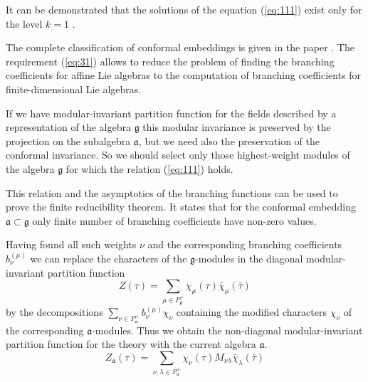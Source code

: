 \documentclass[a4paper,12pt]{article}
\theoremstyle{definition} \newtheorem{Def}{Definition}
\begin{document}
It can be demonstrated that the solutions of the equation (\ref{eq:111}) exist only
for the level $k=1$ \cite{difrancesco1997cft}.

The complete classification of conformal embeddings is given in the paper \cite{schellekens1986conformal}.
The requirement (\ref{eq:31}) allows to reduce the problem of finding the branching coefficients for affine Lie algebras to the computation of branching coefficients for finite-dimensional Lie algebras.

If we have modular-invariant partition function for the fields described by a representation of the algebra $\mathfrak{g}$ this modular invariance is preserved by the projection on the subalgebra $\mathfrak{a}$, but we need also the preservation of the conformal invariance. So we should select only those highest-weight modules of the algebra $\mathfrak{g}$ for which the relation (\ref{eq:111}) holds.

This relation and the asymptotics of the branching functions can be used to prove the finite reducibility theorem. It states that for the conformal embedding  $\mathfrak{a}\subset\mathfrak{g}$ only finite number of branching coefficients have non-zero values.

Having found all such weights $\nu$ and the corresponding branching coefficients $b^{(\mu)}_{\nu}$ we can replace the characters of the $\mathfrak{g}$-modules in the diagonal modular-invariant partition function
\begin{equation}
  \label{eq:34}
   Z(\tau)=\sum_{ \mu\in P^{+}_{\mathfrak{g}}} \chi_{\mu}(\tau)\bar \chi_{\mu}(\bar \tau)
\end{equation}
by the decompositions   $\sum_{\nu \in P^{+}_{\mathfrak{a}}}b^{(\mu)}_{\nu} \chi_{\nu}$ containing the modified characters $\chi_{\nu}$ of the corresponding $\mathfrak{a}$-modules. Thus we obtain the non-diagonal modular-invariant  partition function for the theory with the current algebra $\mathfrak{a}$.
\begin{equation}
  \label{eq:36}
   Z_{\mathfrak{a}}(\tau)=\sum_{ \nu,\lambda\in P^{+}_{\mathfrak{a}}} \chi_{\nu}(\tau)M_{\nu\lambda}\bar \chi_{\lambda}(\bar \tau)
\end{equation}
  
\end{document}
